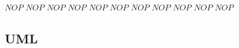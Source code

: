 \documentclass[11pt]{aghdpl}
\begin{document}
\begin{algorithm}
\begin{algorithmic}[1]
\State $NOP$
\State $NOP$
\State $NOP$
\State $NOP$
\State $NOP$
\State $NOP$
\State $NOP$
\State $NOP$
\State $NOP$
\State $NOP$
\State $NOP$

\end{algorithmic}
\end{algorithm}

\cleardoublepage
\subsection{UML}
\end{document}
